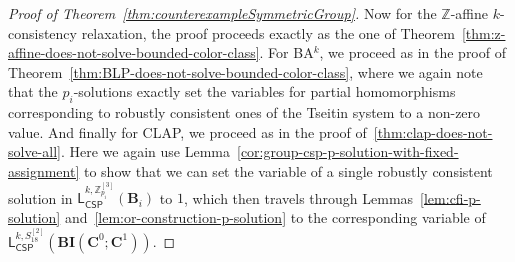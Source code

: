 \documentclass[a4paper,english, thm-restate]{lipics-v2021}
\newcommand{\ZZ}{\mathbb{Z}}
\newcommand{\StructB}{\mathbf{B}}
\newcommand{\StructC}{\mathbf{C}}
\newcommand{\leqs}{\mathsf{L}}
\newcommand{\cspiso}[3]{\leqs^{#1,#2}_{\mathsf{CSP}}(#3)}
\newcommand{\bcisosys}[2]{\mathbf{BI}(#1;#2)}
\newcommand{\CosetGrpTmplt}[2]{#1^{[#2]}}
\newcommand{\Sym}[1]{S_{#1}}
\newcommand{\SymStruct}[2]{\CosetGrpTmplt{\Sym{#1}}{#2}}
\begin{document}
\begin{proof}[Proof of Theorem~\ref{thm:counterexampleSymmetricGroup}]
		Now for the $\ZZ$-affine $k$-consistency relaxation,
		the proof proceeds exactly as the one of Theorem~\ref{thm:z-affine-does-not-solve-bounded-color-class}.
		For BA$^k$,
		we proceed as in the proof of Theorem~\ref{thm:BLP-does-not-solve-bounded-color-class},
		where we again note that the $p_i$-solutions
		exactly set the variables for partial homomorphisms corresponding to robustly consistent ones of the Tseitin system to a non-zero value.
		And finally for CLAP,
		we proceed as in the proof of~\ref{thm:clap-does-not-solve-all}.
		Here we again use Lemma~\ref{cor:group-csp-p-solution-with-fixed-assignment}
		to show that we can set the variable of
		a single robustly consistent solution in 
		$\cspiso{k}{\CosetGrpTmplt{\ZZ_{p_i}}{3}}{\StructB_i}$ to $1$,
		which then travels through Lemmas~\ref{lem:cfi-p-solution}
		and~\ref{lem:or-construction-p-solution}
		to the corresponding variable of 
		$\cspiso{k}{\SymStruct{18}{2}}{\bcisosys{\StructC^0}{\StructC^1}}$.
	\end{proof}
\end{document}

